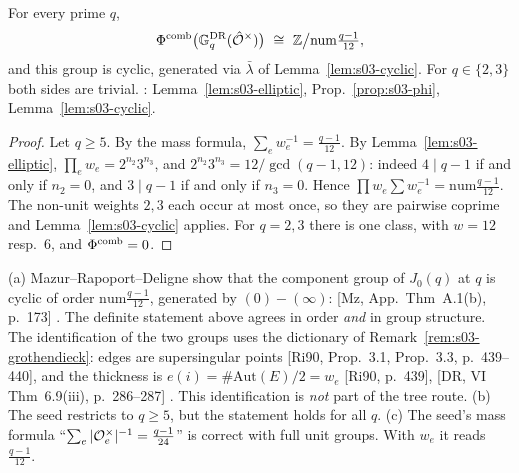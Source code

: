 \begin{proposition}\label{prop:s03-mazur}
For every prime $q$,
\[\Phicomb\big(\GDR_q(\hat\cO^\times)\big)\ \cong\ \Z\big/\mathrm{num}\tfrac{q-1}{12},\]
and this group is cyclic, generated via $\bar\lambda$ of Lemma~\ref{lem:s03-cyclic}. For $q\in\{2,3\}$ both sides are trivial.
\stpmc: Lemma~\ref{lem:s03-elliptic}, Prop.~\ref{prop:s03-phi}, Lemma~\ref{lem:s03-cyclic}.
\end{proposition}
\begin{proof}
Let $q\ge5$. By the mass formula, $\sum_e w_e^{-1}=\frac{q-1}{12}$. By Lemma~\ref{lem:s03-elliptic}, $\prod_ew_e=2^{n_2}3^{n_3}$,
and $2^{n_2}3^{n_3}=12/\gcd(q-1,12)$: indeed $4\mid q-1$ if and only if $n_2=0$, and $3\mid q-1$ if and only if $n_3=0$. Hence
$\prod w_e\sum w_e^{-1}=\mathrm{num}\frac{q-1}{12}$. The non-unit weights $2,3$ each occur at most once, so they are pairwise coprime
and Lemma~\ref{lem:s03-cyclic} applies. For $q=2,3$ there is one class, with $w=12$ resp.\ $6$, and $\Phi^{\mathrm{comb}}=0$.
\end{proof}

\begin{remark}\label{rem:s03-mazur}
(a) Mazur--Rapoport--Deligne show that the component group of $J_0(q)$ at $q$ is cyclic of order $\mathrm{num}\frac{q-1}{12}$,
generated by $(0)-(\infty)$: [Mz, App.\ Thm~A.1(b), p.~173]
 \stcited. The definite
statement above agrees in order \emph{and} in group structure. The identification of the two groups uses the dictionary of
Remark~\ref{rem:s03-grothendieck}: edges are supersingular points [Ri90, Prop.~3.1, Prop.~3.3, p.~439--440], and the thickness is
$e(i)=\#\mathrm{Aut}(E)/2=w_e$ [Ri90, p.~439], [DR, VI Thm~6.9(iii), p.~286--287]
. This identification is
\emph{not} part of the tree route.
(b) The seed restricts to $q\ge5$, but the statement holds for all $q$.
(c) The seed's mass formula ``$\sum_e|\mathcal{O}_e^\times|^{-1}=\frac{q-1}{24}$'' is correct with full unit groups. With $w_e$ it reads
$\frac{q-1}{12}$.
\end{remark}

